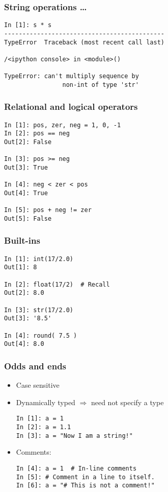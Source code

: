 \documentclass[14pt,compress]{beamer}
\newcounter{time}
\newcommand{\inctime}[1]{\addtocounter{time}{#1}{\tiny \thetime\ m}}
\begin{document}
\begin{frame}[fragile]
  \frametitle{String operations \ldots}
  \begin{lstlisting}
In [1]: s * s
--------------------------------------------
TypeError  Traceback (most recent call last)

/<ipython console> in <module>()

TypeError: can't multiply sequence by
                non-int of type 'str'
  \end{lstlisting}
\end{frame}

\begin{frame}[fragile]
  \frametitle{Relational and logical operators}
  \begin{lstlisting}
In [1]: pos, zer, neg = 1, 0, -1
In [2]: pos == neg
Out[2]: False

In [3]: pos >= neg
Out[3]: True

In [4]: neg < zer < pos
Out[4]: True

In [5]: pos + neg != zer
Out[5]: False
  \end{lstlisting}
\inctime{5}
\end{frame}

\begin{frame}[fragile]
  \frametitle{Built-ins}
  \begin{lstlisting}
In [1]: int(17/2.0)
Out[1]: 8

In [2]: float(17/2)  # Recall
Out[2]: 8.0

In [3]: str(17/2.0)
Out[3]: '8.5'

In [4]: round( 7.5 )
Out[4]: 8.0
  \end{lstlisting}
\end{frame}

\begin{frame}[fragile]
  \frametitle{Odds and ends}
  \begin{itemize}
    \item Case sensitive
    \item Dynamically typed $\Rightarrow$ need not specify a type
      \begin{lstlisting}
In [1]: a = 1
In [2]: a = 1.1
In [3]: a = "Now I am a string!"
      \end{lstlisting}
    \item Comments:
      \begin{lstlisting}
In [4]: a = 1  # In-line comments
In [5]: # Comment in a line to itself.
In [6]: a = "# This is not a comment!"
      \end{lstlisting}
  \end{itemize}
  \inctime{15}
\end{frame}
\end{document}
